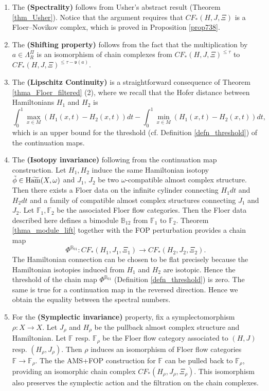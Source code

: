 \documentclass[reqno, 10pt]{amsart}
\numberwithin{equation}{section}
\numberwithin{equation}{section}
\theoremstyle{definition}
\theoremstyle{remark}
\newcommand{\beqn}{\begin{equation*}}
\newcommand{\eeqn}{\end{equation*}}
\newcommand{\mb}{\mathbb}
\newcommand{\mf}{\mathfrak}
\newcommand{\wt}{\widetilde}
\newcommand{\wham}{{\rm H}\wt{\rm am}}
\begin{document}
\begin{enumerate}
    \item The {\bf (Spectrality)} follows from Usher's abstract result (Theorem \ref{thm_Usher}). Notice that the argument requires that $CF_* (H, J, \Xi)$ is a Floer--Novikov complex, which is proved in Proposition \ref{prop738}. 

    \item The {\bf (Shifting property)} follows from the fact that the multiplication by $a \in \Lambda_R^\Pi$ is an isomorphism of chain complexes from $CF_*(H, J, \Xi)^{\leq \tau}$ to $CF_*(H, J, \Xi)^{\leq \tau - \mf{v}(a)}$.

    \item The {\bf (Lipschitz Continuity)} is a straightforward consequence of Theorem \ref{thma_Floer_filtered} (2), where we recall that the Hofer distance between Hamiltonians $H_1$ and $H_2$ is
    $$\int_0^1\max_{x \in M}(H_1(x,t) - H_2(x,t))dt - \int_0^1 \min_{x \in M}(H_1(x,t) - H_2(x,t))dt,$$
    which is an upper bound for the threshold (cf. Definition \ref{defn_threshold}) of the continuation maps.

    \item The {\bf (Isotopy invariance)} following from the continuation map construction. Let $H_1, H_2$ induce the same Hamiltonian isotopy $\tilde \phi \in \wham(X, \omega)$ and $J_1$, $J_2$ be two $\omega$-compatible almost complex structure. Then there exists a Floer data on the infinite cylinder connecting $H_1 dt$ and $H_2 dt$ and a family of compatible almost complex structures connecting $J_1$ and $J_2$. Let $\mb{F}_1, \mb{F}_2$ be the associated Floer flow categories. Then the Floer data described here defines a bimodule ${\mb B}_{12}$ from ${\mb F}_1$ to ${\mb F}_2$. Theorem \ref{thma_module_lift} together with the FOP perturbation provides a chain map 
    \beqn
    \Phi^{\mb{B}_{01}}: CF_*(H_1, J_1, \Xi_1) \to CF_*(H_2, J_2, \Xi_2).
    \eeqn
    The Hamiltonian connection can be chosen to be flat precisely because the Hamiltonian isotopies induced from $H_1$ and $H_2$ are isotopic. Hence the threshold of the chain map $\Phi^{\mb{B}_{01}}$ (Definition \ref{defn_threshold}) is zero. The same is true for a continuation map in the reversed direction. Hence we obtain the equality between the spectral numbers. 

    \item For the {\bf (Symplectic invariance)} property, fix a symplectomorphism $\rho: X \to X$. Let $J_\rho$ and $H_\rho$ be the pullback almost complex structure and Hamiltonian. Let ${\mb F}$ resp. ${\mb F}_\rho$ be the Floer flow category associated to $(H, J)$ resp. $(H_\rho, J_\rho)$. Then $\rho$ induces an isomorphism of Floer flow categories $\mb{F} \to \mb{F}_\rho$. The the AMS+FOP construction for ${\mb F}$ can be pulled back to $\mb{F}_\rho$, providing an isomorphic chain complex $CF_*(H_\rho, J_\rho, \Xi_\rho)$. This isomorphism also preserves the symplectic action and the filtration on the chain complexes. 


\end{enumerate}
\end{document}
